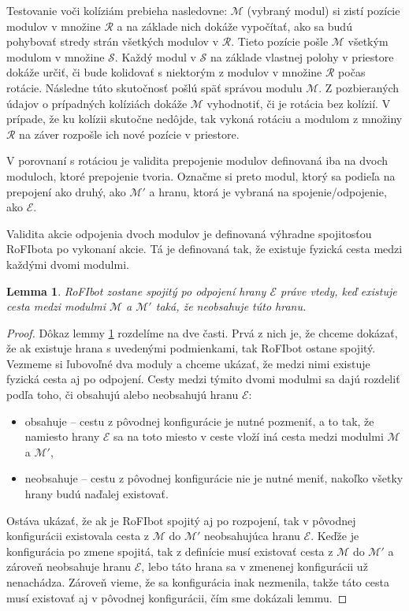 \documentclass[
  digital, %
  oneside, %
  table,   %
  lof,     %
  nolot,     %
]{fithesis3}
\newtheorem{lemma}{Lemma}
\begin{document}
Testovanie voči kolíziám prebieha nasledovne: $\mathcal{M}$ (vybraný modul) si zistí pozície modulov v množine $\mathcal{R}$ a na základe nich dokáže vypočítať, ako sa budú pohybovať stredy strán všetkých modulov v $\mathcal{R}$. Tieto pozície pošle $\mathcal{M}$ všetkým modulom v množine $\mathcal{S}$. Každý modul v $\mathcal{S}$ na základe vlastnej polohy v priestore dokáže určiť, či bude kolidovať s niektorým z modulov v množine $\mathcal{R}$ počas rotácie. Následne túto skutočnosť pošlú späť správou modulu $\mathcal{M}$. Z pozbieraných údajov o prípadných kolíziách dokáže $\mathcal{M}$ vyhodnotiť, či je rotácia bez kolízií. V prípade, že ku kolízii skutočne nedôjde, tak vykoná rotáciu a modulom z množiny $\mathcal{R}$ na záver rozpošle ich nové pozície v priestore. 

V porovnaní s rotáciou je validita prepojenie modulov definovaná iba na dvoch moduloch, ktoré prepojenie tvoria. Označme si preto modul, ktorý sa podieľa na prepojení ako druhý, ako $\mathcal{M}'$ a hranu, ktorá je vybraná na spojenie/odpojenie, ako $\mathcal{E}$. 

Validita akcie odpojenia dvoch modulov je definovaná výhradne spojitosťou RoFIbota po vykonaní akcie. Tá je definovaná tak, že existuje fyzická cesta medzi každými dvomi modulmi. 

\begin{lemma}
\label{lemma:disconnection}
RoFIbot zostane spojitý po odpojení hrany $\mathcal{E}$ práve vtedy, keď existuje cesta medzi modulmi $\mathcal{M}$ a $\mathcal{M}'$ taká, že neobsahuje túto hranu. 
\end{lemma}

\begin{proof}
Dôkaz lemmy \ref{lemma:disconnection} rozdelíme na dve časti. Prvá z nich je, že chceme dokázať, že ak existuje hrana s uvedenými podmienkami, tak RoFIbot ostane spojitý. Vezmeme si ľubovoľné dva moduly a chceme ukázať, že medzi nimi existuje fyzická cesta aj po odpojení. Cesty medzi týmito dvomi modulmi sa dajú rozdeliť podľa toho, či obsahujú alebo neobsahujú hranu $\mathcal{E}$: 
\begin{itemize}
    \item obsahuje -- cestu z pôvodnej konfigurácie je nutné pozmeniť, a to tak, že namiesto hrany $\mathcal{E}$ sa na toto miesto v ceste vloží iná cesta medzi modulmi $\mathcal{M}$ a $\mathcal{M}'$, 
    \item neobsahuje -- cestu z pôvodnej konfigurácie nie je nutné meniť, nakoľko všetky hrany budú naďalej existovať.
\end{itemize}

Ostáva ukázať, že ak je RoFIbot spojitý aj po rozpojení, tak v pôvodnej konfigurácii existovala cesta z $\mathcal{M}$ do $\mathcal{M}'$ neobsahujúca hranu $\mathcal{E}$. Keďže je konfigurácia po zmene spojitá, tak z definície musí existovať cesta z $\mathcal{M}$ do $\mathcal{M}'$ a zároveň neobsahuje hranu $\mathcal{E}$, lebo táto hrana sa v zmenenej konfigurácii už nenachádza. Zároveň vieme, že sa konfigurácia inak nezmenila, takže táto cesta musí existovať aj v pôvodnej konfigurácii, čím sme dokázali lemmu. 

\end{proof}
\end{document}
